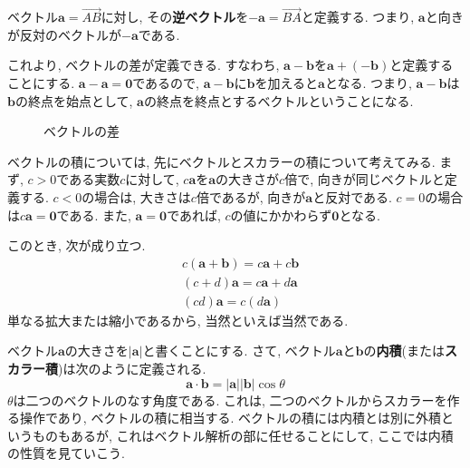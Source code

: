         ベクトル$\bm{a}=\overrightarrow{AB}$に対し, その\textbf{逆ベクトル}を$-\bm{a}=\overrightarrow{BA}$と定義する. つまり, $\bm{a}$と向きが反対のベクトルが$-\bm{a}$である. 

        これより, ベクトルの差が定義できる. すなわち, $\bm{a}-\bm{b}$を$\bm{a}+(-\bm{b})$と定義することにする. $\bm{a}-\bm{a}=\bm{0}$であるので, $\bm{a}-\bm{b}$に$\bm{b}$を加えると$\bm{a}$となる.
        つまり, $\bm{a}-\bm{b}$は$\bm{b}$の終点を始点として, $\bm{a}$の終点を終点とするベクトルということになる.

        \begin{figure}[h]
            \centering
            \caption{ベクトルの差}
        \end{figure}

        ベクトルの積については, 先にベクトルとスカラーの積について考えてみる. まず, $c>0$である実数$c$に対して, $c\bm{a}$を$\bm{a}$の大きさが$c$倍で, 向きが同じベクトルと定義する.
        $c<0$の場合は, 大きさは$c$倍であるが, 向きが$\bm{a}$と反対である. $c=0$の場合は$c\bm{a}=\bm{0}$である. また, $\bm{a}=\bm{0}$であれば, $c$の値にかかわらず$\bm{0}$となる.

        このとき, 次が成り立つ.
        \begin{align}
            &c(\bm{a}+\bm{b})=c\bm{a}+c\bm{b}\\
            &(c+d)\bm{a}=c\bm{a}+d\bm{a}\\
            &(cd)\bm{a}=c(d\bm{a})
        \end{align}
        単なる拡大または縮小であるから, 当然といえば当然である.

        ベクトル$\bm{a}$の大きさを$|\bm{a}|$と書くことにする. さて, ベクトル$\bm{a}$と$\bm{b}$の\textbf{内積}(または\textbf{スカラー積})は次のように定義される.
        \begin{equation}
            \bm{a}\cdot \bm{b}=|\bm{a}||\bm{b}|\cos\theta \label{eq:線形代数:内積の定義}
        \end{equation}
        $\theta$は二つのベクトルのなす角度である. これは, 二つのベクトルからスカラーを作る操作であり, ベクトルの積に相当する. ベクトルの積には内積とは別に外積というものもあるが, これはベクトル解析の部に任せることにして, ここでは内積の性質を見ていこう.

